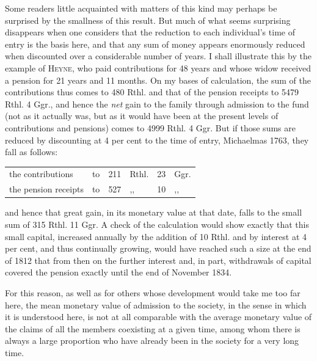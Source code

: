 Some readers little acquainted with matters of this kind may perhaps be surprised by the smallness of this result. But much of what seems surprising disappears when one considers that the reduction to each individual's time of entry is the basis here, and that any sum of money appears enormously reduced when discounted over a considerable number of years. I shall illustrate this by the example of \textsc{Heyne}, who paid contributions for 48 years and whose widow received a pension for 21 years and 11 months. On my bases of calculation, the sum of the contributions thus comes to 480 Rthl. and that of the pension receipts to 5479 Rthl. 4 Ggr., and hence the
\textit{net} gain to the family through admission to the fund (not as it actually was, but as it would have been at the present levels of contributions and pensions) comes to 4999 Rthl. 4 Ggr. But if those sums are reduced by discounting at 4 per cent to the time of entry, Michaelmas 1763, they fall as follows:
\begin{center}
\begin{tabular}{l l r l r l}
the contributions&to&211&Rthl.&23&Ggr.\\
the pension receipts&to&527&,,&10&,,
\end{tabular}
\end{center}
\noindent and hence that great gain, in its monetary value at that date, falls to the small sum of 315 Rthl. 11 Ggr. A check of the calculation would show exactly that this small capital, increased annually by the addition of 10 Rthl. and by interest at 4 per cent, and thus continually growing, would have reached such a size at the end of 1812 that from then on the further interest and, in part, withdrawals of capital covered the pension exactly until the end of November 1834.

For this reason, as well as for others whose development would take me too far here, the mean monetary value of admission to the society, in the sense in which it is understood here, is not at all comparable with the average monetary value of the claims of all the members coexisting at a given time, among whom there is always a large proportion who have already been in the society for a very long time.

